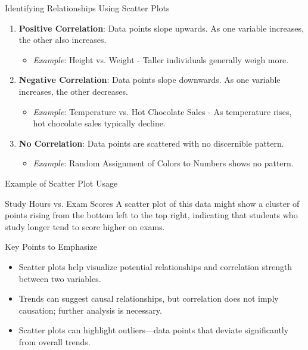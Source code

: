 \documentclass[aspectratio=169]{beamer}
\begin{document}
\begin{frame}[fragile]{Identifying Relationships Using Scatter Plots}
    \begin{enumerate}
        \item \textbf{Positive Correlation}: Data points slope upwards. As one variable increases, the other also increases.
            \begin{itemize}
                \item \textit{Example}: Height vs. Weight - Taller individuals generally weigh more.
            \end{itemize}
        
        \item \textbf{Negative Correlation}: Data points slope downwards. As one variable increases, the other decreases.
            \begin{itemize}
                \item \textit{Example}: Temperature vs. Hot Chocolate Sales - As temperature rises, hot chocolate sales typically decline.
            \end{itemize}

        \item \textbf{No Correlation}: Data points are scattered with no discernible pattern.
            \begin{itemize}
                \item \textit{Example}: Random Assignment of Colors to Numbers shows no pattern.
            \end{itemize}
    \end{enumerate}
\end{frame}

\begin{frame}[fragile]{Example of Scatter Plot Usage}
    \begin{block}{Study Hours vs. Exam Scores}
        A scatter plot of this data might show a cluster of points rising from the bottom left to the top right, indicating that students who study longer tend to score higher on exams.
    \end{block}

    \begin{block}{Key Points to Emphasize}
        \begin{itemize}
            \item Scatter plots help visualize potential relationships and correlation strength between two variables.
            \item Trends can suggest causal relationships, but correlation does not imply causation; further analysis is necessary.
            \item Scatter plots can highlight outliers—data points that deviate significantly from overall trends.
        \end{itemize}
    \end{block}
\end{frame}
\end{document}
